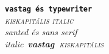 \documentclass{article}
\begin{document}
\texttt{\textbf{vastag és typewriter}}\\
\textit{\textsc{kiskapitális italic}}\\
\textsf{\textsl{santed és sans serif}}\\

\emph{\textit{italic\ }\textbf{vastag\ }\textsc{kiskapitális}}
\end{document}
